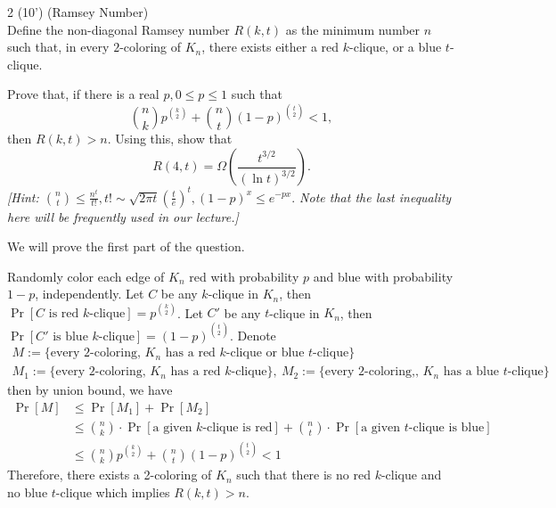 \begin{question}{2 (10') (Ramsey Number)}~\\
Define the non-diagonal Ramsey number $R(k,t)$ as the minimum number $n$ such that, in every $2$-coloring of $K_n$, there exists either a red $k$-clique, or a blue $t$-clique. 

Prove that, if there is a real $p, 0\leq p\leq 1$ such that
$$
\binom{n}{k}p^{\binom{k}{2}}+\binom{n}{t}(1-p)^{\binom{t}{2}}<1,
$$
then $R(k,t)>n$. Using this, show that
$$
R(4,t)=\Omega\left(\frac{t^{3/2}}{(\ln t)^{3/2}}\right).
$$
\textit{[Hint: $\binom{n}{t} \le \frac{n^t}{t!},t! \sim \sqrt{2\pi t}(\frac{t}{e})^t, (1-p)^x \le e^{-px}.$ Note that the last inequality here will be frequently used in our lecture.]}
\end{question}

\begin{answer}
    We will prove the first part of the question.
    
    Randomly color each edge of $K_n$ red with probability $p$ and blue with probability $1-p$, independently. 
    Let $C$ be any $k$-clique in $K_n$, then $\Pr[C \text{ is red $k$-clique}] = p^{\binom{k}{2}}$. 
    Let $C'$ be any $t$-clique in $K_n$, then $\Pr[C' \text{ is blue $k$-clique}] = (1-p)^{\binom{t}{2}}$.
    Denote 
    \begin{gather*}
        M := \{\text{every 2-coloring, $K_n$ has a red $k$-clique or blue $t$-clique} \} \\
        M_1 := \{\text{every 2-coloring, $K_n$ has a red $k$-clique} \},~ M_2 := \{\text{every 2-coloring,, $K_n$ has a blue $t$-clique} \} 
    \end{gather*}
    then by union bound, we have
    \begin{align*}
        \Pr[M] &\le \Pr[M_1] + \Pr[M_2] \\
        &\le \binom{n}{k} \cdot \Pr[\text{a given $k$-clique is red}] + \binom{n}{t} \cdot \Pr[\text{a given $t$-clique is blue}] \\
        &\le \binom{n}{k} p^{\binom{k}{2}} + \binom{n}{t} (1-p)^{\binom{t}{2}} < 1
    \end{align*}
    Therefore, there exists a 2-coloring of $K_n$ such that there is no red $k$-clique and no blue $t$-clique which implies $R(k,t) > n$.


\end{answer}
